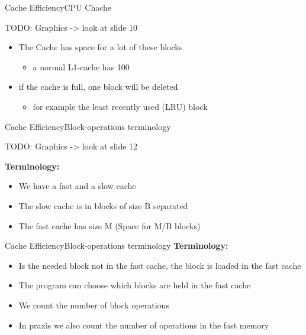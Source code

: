 
\begin{frame}{Cache Efficiency}{CPU Chache}

TODO: Graphics -> look at slide 10 \vspace{2em}

	\begin{itemize}
		\item
			The Cache has space for a lot of these blocks
		\begin{itemize}
			\item
				a normal L1-cache has \SI{100}{\kilo \byte}
		\end{itemize}
		\item
			if the cache is full, one block will be deleted
		\begin{itemize}
			\item
				for example the least recently used (LRU) block
		\end{itemize}
	\end{itemize}
\end{frame}


\begin{frame}{Cache Efficiency}{Block-operations terminology}
	
	TODO: Graphics -> look at slide 12 \vspace{2em}
	
	\textbf{Terminology:}
	\begin{itemize}
		\item
			We have a fast and a slow cache
		\item
			The slow cache is in blocks of size B separated
		\item
			The fast cache has size M (Space for M/B blocks)
	\end{itemize}
\end{frame}


\begin{frame}{Cache Efficiency}{Block-operations terminology}
	\textbf{Terminology:}
	\begin{itemize}
		\item
			Is the needed block not in the fast cache, the block is loaded in the 
			fast cache
		\item
			The program can choose which blocks are held in the fast cache
		\item
			We count the number of block operations
		\item
			In praxis we also count the number of operations in the fast memory
	\end{itemize}
\end{frame}

